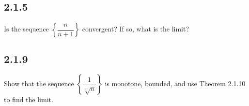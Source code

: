 \documentclass{article}
\begin{document}
\subsection{2.1.5}Is the sequence
$\left\{ \dfrac{n}{n+1} \right\}$
convergent?  If so, what is the limit?
\mysolution{

} %


\subsection{2.1.9}Show that the sequence
$\left\{ \dfrac{1}{\sqrt[3]{n}} \right\}$ is monotone, bounded, and use
Theorem 2.1.10 to find the limit.
\iftoggle{showsolutions}{\begin{solution} 

\end{solution}}{}
\end{document}
